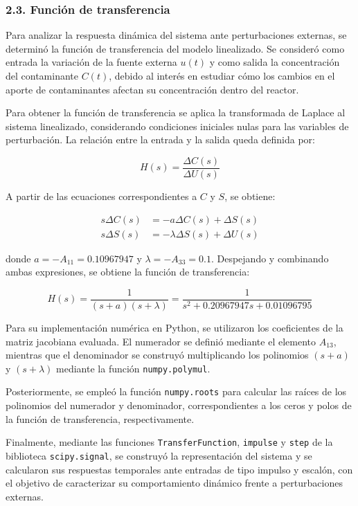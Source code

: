 \documentclass[11pt]{article}
\begin{document}
    \subsubsection{2.3. Función de
transferencia}\label{funciuxf3n-de-transferencia}

Para analizar la respuesta dinámica del sistema ante perturbaciones
externas, se determinó la función de transferencia del modelo
linealizado. Se consideró como entrada la variación de la fuente externa
\(u(t)\) y como salida la concentración del contaminante \(C(t)\),
debido al interés en estudiar cómo los cambios en el aporte de
contaminantes afectan su concentración dentro del reactor.

Para obtener la función de transferencia se aplica la transformada de
Laplace al sistema linealizado, considerando condiciones iniciales nulas
para las variables de perturbación. La relación entre la entrada y la
salida queda definida por:

\[
H(s)=\frac{\Delta C(s)}{\Delta U(s)}
\tag{12}
\]

A partir de las ecuaciones correspondientes a \(C\) y \(S\), se obtiene:

\[
\begin{aligned}
s\Delta C(s)&=-a\Delta C(s)+\Delta S(s)\\
s\Delta S(s)&=-\lambda\Delta S(s)+\Delta U(s)
\end{aligned}
\]

donde \(a=-A_{11}=0.10967947\) y \(\lambda=-A_{33}=0.1\). Despejando y
combinando ambas expresiones, se obtiene la función de transferencia:

\[
\boxed{
H(s)=\frac{1}{(s+a)(s+\lambda)}
=\frac{1}{s^2+0.20967947s+0.01096795}
}
\tag{13}
\]

Para su implementación numérica en Python, se utilizaron los
coeficientes de la matriz jacobiana evaluada. El numerador se definió
mediante el elemento \(A_{13}\), mientras que el denominador se
construyó multiplicando los polinomios \((s+a)\) y \((s+\lambda)\)
mediante la función \texttt{numpy.polymul}.

Posteriormente, se empleó la función \texttt{numpy.roots} para calcular
las raíces de los polinomios del numerador y denominador,
correspondientes a los ceros y polos de la función de transferencia,
respectivamente.

Finalmente, mediante las funciones \texttt{TransferFunction},
\texttt{impulse} y \texttt{step} de la biblioteca \texttt{scipy.signal},
se construyó la representación del sistema y se calcularon sus
respuestas temporales ante entradas de tipo impulso y escalón, con el
objetivo de caracterizar su comportamiento dinámico frente a
perturbaciones externas.
\end{document}
